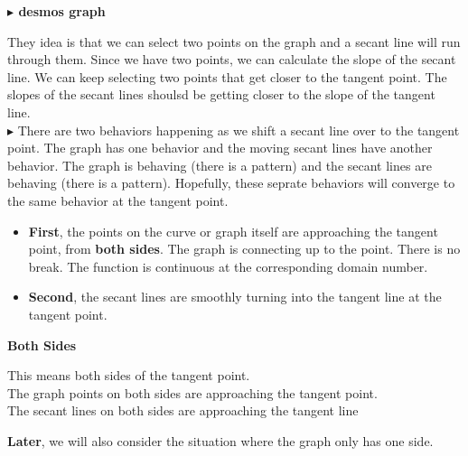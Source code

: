 \documentclass{ximera}
\begin{document}
\textbf{\textcolor{blue!55!black}{$\blacktriangleright$ desmos graph}} 
\begin{center}
\end{center}


They idea is that we can select two points on the graph and a secant line will run through them. Since we have two points, we can calculate the slope of the secant line. We can keep selecting two points that get closer to the tangent point. The slopes of the secant lines shoulsd be getting closer to the slope of the tangent line. \\




\textbf{\textcolor{red!90!darkgray}{$\blacktriangleright$}} There are two behaviors happening as we shift a secant line over to the tangent point. The graph has one behavior and the moving secant lines have another behavior. The graph is behaving (there is a pattern) and the secant lines are behaving (there is a pattern). Hopefully, these seprate behaviors will converge to the same behavior at the tangent point.\\



\begin{itemize}
\item \textbf{First}, the points on the curve or graph itself are approaching the tangent point, from \textbf{both sides}. The graph is connecting up to the point. There is no break. The function is continuous at the corresponding domain number.\\
\item \textbf{Second}, the secant lines are smoothly turning into the tangent line at the tangent point. \\
\end{itemize}



\begin{warning} \textbf{\textcolor{red!80!black}{Both Sides}}

This means both sides of the tangent point. \\

The graph points on both sides are approaching the tangent point. \\

The secant lines on both sides are approaching the tangent line




\end{warning}
\textbf{Later}, we will also consider the situation where the graph only has one side. \\
\end{document}
